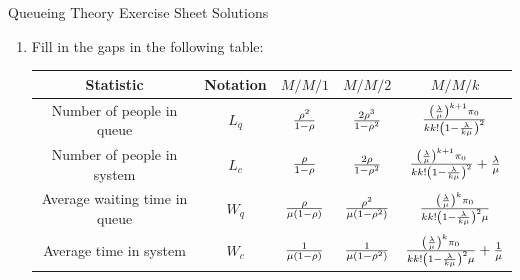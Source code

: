 \documentclass[12pt]{article}
\begin{document}
\begin{center}
\Huge{Queueing Theory Exercise Sheet Solutions}
\end{center}

\begin{enumerate}
\item Fill in the gaps in the following table:
\begin{center}
\begin{tabular}{c|c|c|c|c}
\hline
Statistic& Notation & $M/M/1$ & $M/M/2$ & $M/M/k$ \\\hline
Number of people in queue  & $L_q$ &   ${\rho^2\over 1-\rho}$       & ${2\rho^3\over 1-\rho^2}$  &  ${\left(\lambda\over \mu \right)^{k+1}\pi_0\over kk!\left(1-{\lambda\over k\mu} \right)^2}$    \\
Number of people in system & $L_c$ &   ${\rho\over 1-\rho}$       &   ${2\rho\over 1-\rho^2}$  &  ${\left(\lambda\over \mu \right)^{k+1}\pi_0\over kk!\left(1-{\lambda\over k\mu} \right)^2}+{\lambda\over \mu}$  \\
Average waiting time in queue & $W_q$ &    ${\rho\over \mu(1-\rho)}$    & ${\rho^2\over\mu( 1-\rho^2)}$ &  ${\left(\lambda\over \mu \right)^{k}\pi_0\over kk!\left(1-{\lambda\over k\mu} \right)^2\mu}$       \\
Average time in system & $W_c$ &   ${1\over \mu(1-\rho)}$       &${1\over\mu( 1-\rho^2)}$ &${\left(\lambda\over \mu \right)^{k}\pi_0\over kk!\left(1-{\lambda\over k\mu} \right)^2\mu}+{1\over \mu}$
\end{tabular}
\end{center}


\end{enumerate}
\end{document}
